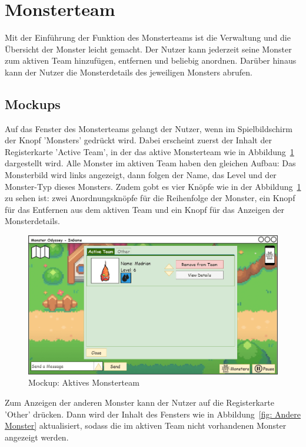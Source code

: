\section{Monsterteam}\label{sec:monster-team}
Mit der Einführung der Funktion des Monsterteams ist die Verwaltung und die Übersicht der Monster leicht gemacht. 
Der Nutzer kann jederzeit seine Monster zum aktiven Team hinzufügen, entfernen und beliebig anordnen. 
Darüber hinaus kann der Nutzer die Monsterdetails des jeweiligen Monsters abrufen.
\subsection{Mockups}\label{subsec:mockups-monster-team}
Auf das Fenster des Monsterteams gelangt der Nutzer, wenn im Spielbildschirm der Knopf 'Monsters' gedrückt wird. 
Dabei erscheint zuerst der Inhalt der Registerkarte 'Active Team', in der das aktive Monsterteam wie in Abbildung~\ref{fig: Aktive Monster} dargestellt wird.
Alle Monster im aktiven Team haben den gleichen Aufbau: Das Monsterbild wird links angezeigt, dann folgen der Name, das Level und der Monster-Typ dieses Monsters.
Zudem gobt es vier Knöpfe wie in der Abbildung~\ref{fig: Aktive Monster} zu sehen ist: zwei Anordnungsknöpfe für die Reihenfolge der Monster, ein Knopf für das Entfernen aus dem aktiven Team und ein Knopf für das Anzeigen der Monsterdetails.
\begin{figure}[H]
    \center
    \includegraphics[scale=\scale]{images/mockups/Monster/IngameMonsterMonsterActiveWithoutFlamurtle.png}
    \caption{Mockup: Aktives Monsterteam}
    \label{fig: Aktive Monster}
\end{figure}
Zum Anzeigen der anderen Monster kann der Nutzer auf die Registerkarte 'Other' drücken. 
Dann wird der Inhalt des Fensters wie in Abbildung~\ref{fig: Andere Monster} aktualisiert, sodass die im aktiven Team nicht vorhandenen Monster angezeigt werden. 
